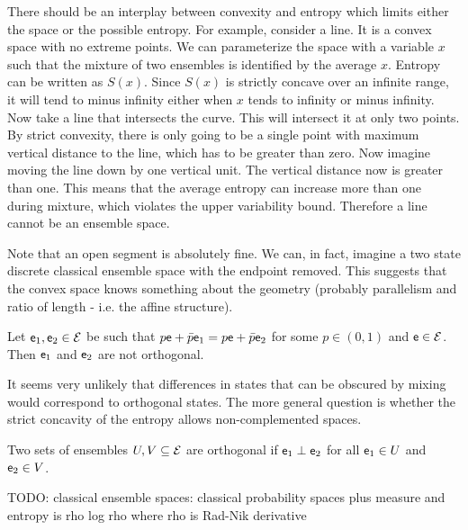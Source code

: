 \begin{remark}
	There should be an interplay between convexity and entropy which limits either the space or the possible entropy. For example, consider a line. It is a convex space with no extreme points. We can parameterize the space with a variable $x$ such that the mixture of two ensembles is identified by the average $x$. Entropy can be written as $S(x)$. Since $S(x)$ is strictly concave over an infinite range, it will tend to minus infinity either when $x$ tends to infinity or minus infinity. Now take a line that intersects the curve. This will intersect it at only two points. By strict convexity, there is only going to be a single point with maximum vertical distance to the line, which has to be greater than zero. Now imagine moving the line down by one vertical unit. The vertical distance now is greater than one. This means that the average entropy can increase more than one during mixture, which violates the upper variability bound. Therefore a line cannot be an ensemble space.
	
	Note that an open segment is absolutely fine. We can, in fact, imagine a two state discrete classical ensemble space with the endpoint removed. This suggests that the convex space knows something about the geometry (probably parallelism and ratio of length - i.e. the affine structure).
\end{remark}

\begin{conj}
	Let $\mathsf{e}_1, \mathsf{e}_2 \in \mathcal{E}$ be such that $p\mathsf{e} + \bar{p} \mathsf{e}_1 = p\mathsf{e} + \bar{p} \mathsf{e}_2$ for some $p \in (0, 1)$ and $\mathsf{e} \in \mathcal{E}$. Then $\mathsf{e}_1$ and $\mathsf{e}_2$ are not orthogonal.
\end{conj}

\begin{remark}
	It seems very unlikely that differences in states that can be obscured by mixing would correspond to orthogonal states. The more general question is whether the strict concavity of the entropy allows non-complemented spaces.
\end{remark}

\begin{defn}
	Two sets of ensembles $U, V \subseteq \mathcal{E}$ are orthogonal if $\mathsf{e}_1 \perp \mathsf{e}_2$ for all $\mathsf{e}_1 \in U$ and $\mathsf{e}_2 \in V$. 
\end{defn}

TODO: classical ensemble spaces: classical probability spaces plus measure and entropy is rho log rho where rho is Rad-Nik derivative

